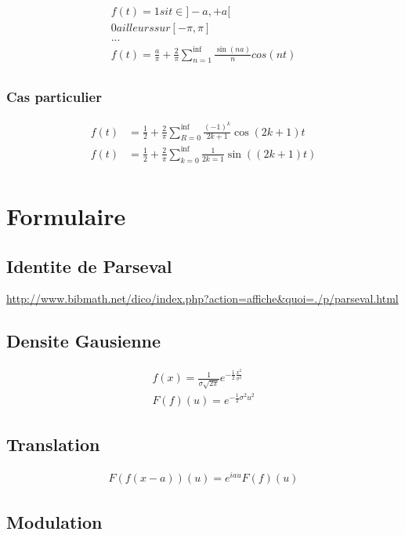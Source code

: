 \documentclass[a4paper,11pt]{article}
\begin{document}
\begin{align*}
  f(t) = 1 si t \in ]-a, +a[\\
        0 ailleurs sur [-\pi,\pi]\\
        ...\\
        f(t) = \frac{a}{\pi} + \frac{2}{\pi} \sum_{n = 1}^{\inf} \frac{\sin(n a)}{n} cos(nt)\\
\end{align*}

\subsubsection{Cas particulier}
\begin{align*}
f(t) &= \frac{1}{2} + \frac{2}{\pi}\sum_{R = 0}^{\inf} \frac{(-1)^k}{2k + 1} \cos{(2k +1) }t  \\
f(t) &= \frac{1}{2} + \frac{2}{\pi} \sum_{k = 0}^{\inf} \frac{1}{2k =1} \sin((2k +1)t)\\
\end{align*}

\section{Formulaire}
\subsection{Identite de Parseval}

\url{http://www.bibmath.net/dico/index.php?action=affiche&quoi=./p/parseval.html}

\subsection{Densite Gausienne}

\begin{align*}
  f(x) = \frac{1}{\sigma \sqrt{2\pi}} e^{-\frac{1}{2}\frac{x^2}{\sigma^2}}\\
  F(f)(u) = e^{- \frac{1}{2} \sigma^2 u^2}
\end{align*}


\subsection{Translation}
\begin{align*}
  F(f(x-a))(u) = e^{iau} F(f)(u)
\end{align*}

\subsection{Modulation}
\end{document}
